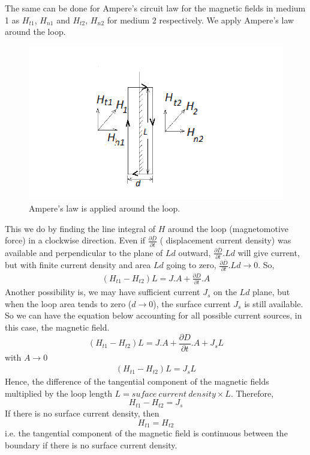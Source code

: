 The same can be done for Ampere's circuit law for the magnetic fields in medium 1 as $H_{t1}$, $H_{n1}$ and $H_{t2}$, $H_{n2}$ for medium 2 respectively. We apply Ampere's law around the loop.
\begin{figure}[h]
\centering
\includegraphics[width=1\linewidth]{./graphics/diemedium4_2}
\caption{Ampere's law is applied around the loop.}
\end{figure}
This we do by finding the line integral of $H$ around the loop (magnetomotive force) in a clockwise direction. Even if $\frac{\partial\bar{D}}{\partial t}$ ( displacement current density) was available and perpendicular to the plane of $Ld$ outward, $\frac{\partial\bar{D}}{\partial t}. Ld$ will give current, but with finite current density and area $Ld$ going to zero,  $\frac{\partial\bar{D}}{\partial t}. Ld \rightarrow 0 $. So,
\begin{align*}
(H_{t1} - H_{t2})L = J.A +\frac{\partial D}{\partial t}.A
\end{align*}
Another possibility is, we may have sufficient current $J_s$ on the $Ld$ plane, but when the loop area tends to zero ($d \rightarrow 0 $), the surface current $J_s$ is still available. So we can have the equation below accounting for all possible current sources, in this case, the magnetic field.
\begin{equation}
(H_{t1} - H_{t2})L = J.A +\frac{\partial D}{\partial t}.A + J_sL
\end{equation}
with $A \rightarrow 0$
\begin{align*}
(H_{t1} - H_{t2})L = J_sL
\end{align*}
Hence, the difference of the tangential component of the magnetic fields multiplied by the loop length $L = suface\ current\ density \times L$. Therefore,
\begin{equation}
H_{t1} - H_{t2} = J_s
\end{equation}
If there is no surface current density, then 
\begin{equation}
H_{t1} = H_{t2}
\end{equation}
i.e. the tangential component of the magnetic field is continuous between the boundary if there is no surface current density.

